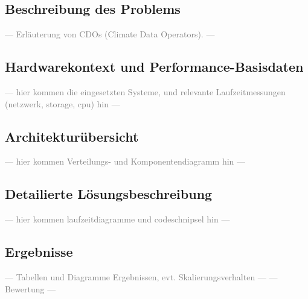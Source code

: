 \subsection{Beschreibung des Problems}
\textcolor{gray}{--- Erläuterung von CDOs (Climate Data Operators). ---}
\subsection{Hardwarekontext und Performance-Basisdaten}
\textcolor{gray}{--- hier kommen die eingesetzten Systeme, und relevante Laufzeitmessungen (netzwerk, storage, cpu) hin ---}
\subsection{Architekturübersicht}
\textcolor{gray}{--- hier kommen Verteilungs- und Komponentendiagramm hin ---}
\subsection{Detailierte Lösungsbeschreibung}
\textcolor{gray}{--- hier kommen laufzeitdiagramme und codeschnipsel hin ---}
\subsection{Ergebnisse}
\textcolor{gray}{--- Tabellen und Diagramme Ergebnissen, evt. Skalierungsverhalten ---}
\textcolor{gray}{--- Bewertung ---}
